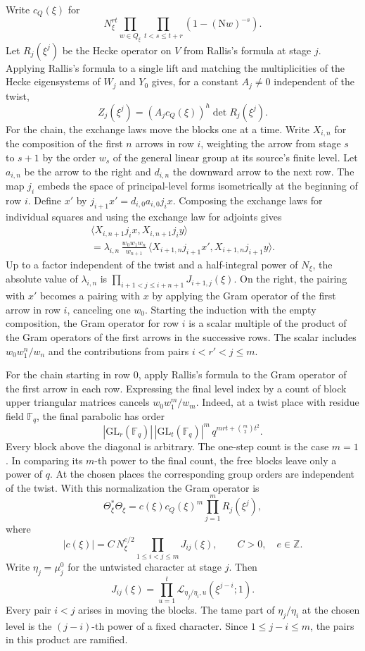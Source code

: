 Write \(c_Q(\xi)\) for
\[
 N_\xi^{rt}\prod_{w\in Q_\xi}\prod_{t<s\le t+r}(1-(\mathrm Nw)^{-s}).
\]
Let \(R_j(\xi^j)\) be the Hecke operator on \(V\) from Rallis's formula
at stage \(j\). Applying Rallis's formula to a single lift and matching
the multiplicities of the Hecke eigensystems of \(W_j\) and \(Y_0\)
gives, for a constant \(A_j\ne0\) independent of the twist,
\[
 Z_j(\xi^j)=(A_jc_Q(\xi))^h\det R_j(\xi^j).
\]
For the chain, the exchange laws move the blocks one at a time.
Write \(X_{i,n}\) for the composition of the first \(n\) arrows in row
\(i\), weighting the arrow from stage \(s\) to \(s+1\) by the order
\(w_s\) of the general linear group at its source's finite level.
Let \(a_{i,n}\) be the arrow to the right and \(d_{i,n}\) the downward
arrow to the next row. The map \(j_i\) embeds the space of principal-level
forms isometrically at the beginning of row \(i\). Define \(x'\) by
\(j_{i+1}x'=d_{i,0}a_{i,0}j_i x\).
Composing the exchange laws for individual squares and using the
exchange law for adjoints gives
\begin{multline*}
  \langle X_{i,n+1}j_i x,X_{i,n+1}j_i y\rangle\\
   = \lambda_{i,n}\,\frac{w_0w_1w_n}{w_{n+1}}\,
     \langle X_{i+1,n}j_{i+1}x',X_{i+1,n}j_{i+1}y\rangle.
\end{multline*}
Up to a factor independent of the twist and a half-integral power of
\(N_\xi\), the absolute value of \(\lambda_{i,n}\) is
\(\prod_{i+1<j\le i+n+1}J_{i+1,j}(\xi)\).
On the right, the pairing with \(x'\) becomes a pairing with \(x\)
by applying the Gram operator of the first arrow in row \(i\),
canceling one \(w_0\). Starting the induction with the empty
composition, the Gram operator for row \(i\) is a scalar multiple of the
product of the Gram operators of the first arrows in the successive rows.
The scalar includes \(w_0w_1^n/w_n\) and the contributions from pairs
\(i<r'<j\le m\).

For the chain starting in row \(0\), apply Rallis's formula to the
Gram operator of the first arrow in each row. Expressing the final level
index by a count of block upper triangular matrices cancels
\(w_0w_1^m/w_m\). Indeed, at a twist place with residue field
\(\mathbb F_q\), the final parabolic has order
\[
 |\mathrm{GL}_{r}(\mathbb F_q)|\,|\mathrm{GL}_{t}(\mathbb F_q)|^m\,
     q^{mrt+\binom{m}{2}t^2}.
\]
Every block above the diagonal is arbitrary. The one-step count
is the case \(m=1\). In comparing its \(m\)-th power to the final
count, the free blocks leave only a power of \(q\).
At the chosen places the corresponding group orders are independent
of the twist. With this normalization the Gram operator is
\[
 \Theta_\xi^*\Theta_\xi
       = c(\xi)c_Q(\xi)^m \prod_{j=1}^m R_j(\xi^j),
\]
where
\[
 |c(\xi)| = C\,N_\xi^{e/2}\prod_{1\le i<j\le m} J_{ij}(\xi),
 \qquad C>0,\quad e\in\mathbb Z.
\]
Write \(\eta_j=\mu_j^0\) for the untwisted character at stage \(j\).
Then
\[
 J_{ij}(\xi)=
   \prod_{u=1}^{t}\mathcal L_{\eta_j/\eta_i,u}(\xi^{j-i};1).
\]
Every pair \(i<j\) arises in moving the blocks. The tame part of
\(\eta_j/\eta_i\) at the chosen level is the \((j-i)\)-th power of a
fixed character. Since \(1\le j-i\le m\), the pairs in this product are
ramified.

